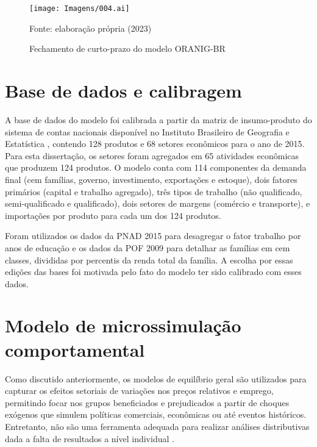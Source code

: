 \begin{landscape}
	\begin{figure}
		\centering
		\texttt{[image: Imagens/004.ai]}
		\caption{Fechamento de curto-prazo do modelo ORANIG-BR}
		\label{fig:fechamento}
		\footnotesize
		Fonte: elaboração própria (2023)
	\end{figure}
\end{landscape}


\section{Base de dados e calibragem} \label{sec:dados}

A base de dados do modelo foi calibrada a partir da matriz de insumo-produto do sistema de contas nacionais disponível no Instituto Brasileiro de Geografia e Estatística \cite{scn}, contendo 128 produtos e 68 setores econômicos para o ano de 2015. Para esta dissertação, os setores foram agregados em 65 atividades econômicas que produzem 124 produtos. O modelo conta com 114 componentes da demanda final (cem famílias, governo, investimento, exportações e estoque), dois fatores primários (capital e trabalho agregado), três tipos de trabalho (não qualificado, semi-qualificado e qualificado), dois setores de margens (comércio e transporte), e importações por produto para cada um dos 124 produtos.

Foram utilizados os dados da PNAD 2015 \cite{pnad} para desagregar o fator trabalho por anos de educação e os dados da POF 2009 \cite{pof} para detalhar as famílias em cem classes, divididas por percentis da renda total da família. A escolha por essas edições das bases foi motivada pelo fato do modelo ter sido calibrado com esses dados.


\section{Modelo de microssimulação comportamental} \label{sec:microssimulacao}

Como discutido anteriormente, os modelos de equilíbrio geral são utilizados para capturar os efeitos setoriais de variações nos preços relativos e emprego, permitindo focar nos grupos beneficiados e prejudicados a partir de choques exógenos que simulem políticas comerciais, econômicas ou até eventos históricos. Entretanto, não são uma ferramenta adequada para realizar análises distributivas dada a falta de resultados a nível individual \cite{tiberti17}.

